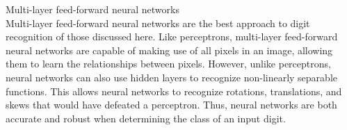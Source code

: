 \documentclass[solution, letterpaper]{cs121}
\begin{document}
\subproblem Multi-layer feed-forward neural networks \\

Multi-layer feed-forward neural networks are the best approach to digit recognition of those discussed here. Like perceptrons, multi-layer feed-forward neural networks are capable of making use of all pixels in an image, allowing them to learn the relationships between pixels. However, unlike perceptrons, neural networks can also use hidden layers to recognize non-linearly separable functions. This allows neural networks to recognize rotations, translations, and skews that would have defeated a perceptron. Thus, neural networks are both accurate and robust when determining the class of an input digit.


\problem{}

\problem{}
\end{document}
